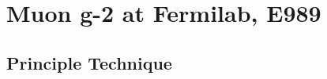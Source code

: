 \chapter{Muon g-2 at Fermilab, E989}
\label{chapter:Muon g-2 at Fermilab, E989}
\thispagestyle{myheadings} %

\section{Principle Technique}
\label{sec:PrincipleTechnique}
